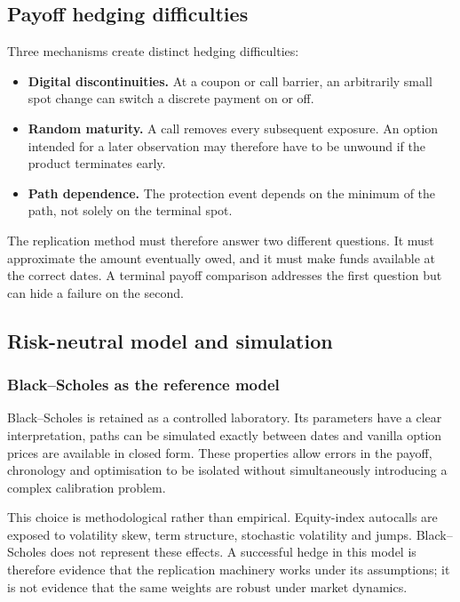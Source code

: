 \documentclass[12pt,a4paper]{article}
\newcommand{\1}{\mathbf{1}}
\begin{document}
\subsection{Payoff hedging difficulties}

Three mechanisms create distinct hedging difficulties:

\begin{itemize}
\item \textbf{Digital discontinuities.} At a coupon or call barrier, an
arbitrarily small spot change can switch a discrete payment on or off.
\item \textbf{Random maturity.} A call removes every subsequent exposure. An
option intended for a later observation may therefore have to be unwound if
the product terminates early.
\item \textbf{Path dependence.} The protection event depends on the minimum of
the path, not solely on the terminal spot.
\end{itemize}

The replication method must therefore answer two different questions. It must
approximate the amount eventually owed, and it must make funds available at
the correct dates. A terminal payoff comparison addresses the first question
but can hide a failure on the second.

\subsection{Risk-neutral model and simulation}

\subsubsection*{Black--Scholes as the reference model}

Black--Scholes is retained as a controlled laboratory. Its parameters have a
clear interpretation, paths can be simulated exactly between dates and vanilla
option prices are available in closed form. These properties allow errors in
the payoff, chronology and optimisation to be isolated without simultaneously
introducing a complex calibration problem.

This choice is methodological rather than empirical. Equity-index autocalls
are exposed to volatility skew, term structure, stochastic volatility and
jumps. Black--Scholes does not represent these effects. A successful hedge in
this model is therefore evidence that the replication machinery works under
its assumptions; it is not evidence that the same weights are robust under
market dynamics.
\end{document}
